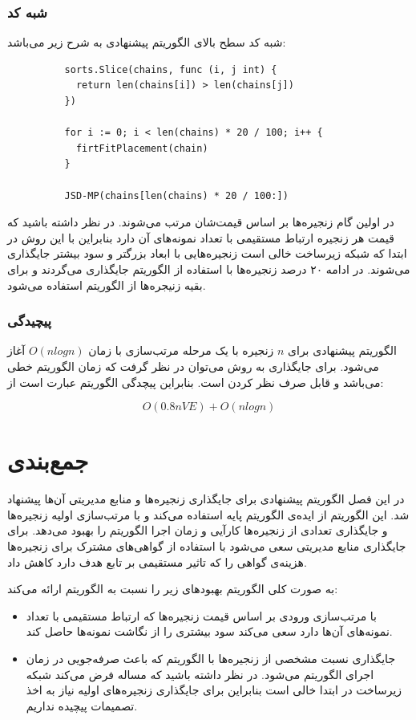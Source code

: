 \subsubsection{شبه کد}

شبه کد سطح بالای الگوریتم پیشنهادی به شرح زیر می‌باشد:

\begin{latin}
    \begin{verbatim}
          sorts.Slice(chains, func (i, j int) {
            return len(chains[i]) > len(chains[j])
          })

          for i := 0; i < len(chains) * 20 / 100; i++ {
            firtFitPlacement(chain)
          }

          JSD-MP(chains[len(chains) * 20 / 100:])
    \end{verbatim}
\end{latin}

در اولین گام زنجیره‌ها بر اساس قیمت‌شان مرتب می‌شوند.
در نظر داشته باشید که قیمت هر زنجیره ارتباط مستقیمی با تعداد نمونه‌های آن دارد
بنابراین با این روش در ابتدا که شبکه زیرساخت خالی است زنجیره‌هایی با ابعاد بزرگتر و سود بیشتر جایگذاری می‌شوند.
در ادامه ۲۰ درصد زنجیره‌ها با استفاده از الگوریتم 
جایگذاری می‌گردند و برای بقیه زنیجره‌ها از الگوریتم 
استفاده می‌شود.

\subsubsection{پیچیدگی}

الگوریتم پیشنهادی برای \(n\) زنجیره با یک مرحله مرتب‌سازی با زمان \(O(nlogn)\) آغاز می‌شود.
برای جایگذاری به روش  می‌توان در نظر گرفت که زمان الگوریتم خطی می‌باشد و قابل صرف نظر کردن است.
بنابراین پیچدگی الگوریتم عبارت است از:

$$
O(0.8nVE) + O(nlogn)
$$

\section{جمع‌بندی}

در این فصل الگوریتم پیشنهادی برای جایگذاری زنجیره‌ها و منابع مدیریتی آن‌ها پیشنهاد شد.
این الگوریتم از ایده‌ی الگوریتم \cite{Bari2015}
پایه استفاده می‌کند و با مرتب‌سازی اولیه زنجیره‌ها
و جایگذاری 
تعدادی از زنجیره‌ها کارآیی و زمان اجرا الگوریتم را بهبود می‌دهد.
برای جایگذاری منابع مدیریتی سعی می‌شود با استفاده از گواهی‌های مشترک برای زنجیره‌ها
هزینه‌ی گواهی را که تاثیر مستقیمی بر تابع هدف دارد کاهش داد.

به صورت کلی الگوریتم  بهبودهای زیر را نسبت به الگوریتم  ارائه می‌کند:

\begin{itemize}
  \item
  با مرتب‌سازی ورودی بر اساس قیمت زنجیره‌ها که ارتباط مستقیمی با تعداد نمونه‌های آن‌ها دارد
  سعی می‌کند سود بیشتری را از نگاشت نمونه‌ها حاصل کند.
  \item
  جایگذاری نسبت مشخصی از زنجیره‌ها با الگوریتم  که باعث صرفه‌جویی در زمان اجرای الگوریتم می‌شود.
  در نظر داشته باشید که مساله فرض می‌کند شبکه زیرساخت در ابتدا خالی است بنابراین برای جایگذاری زنجیره‌های اولیه نیاز به اخذ تصمیمات پیچیده نداریم.
\end{itemize}